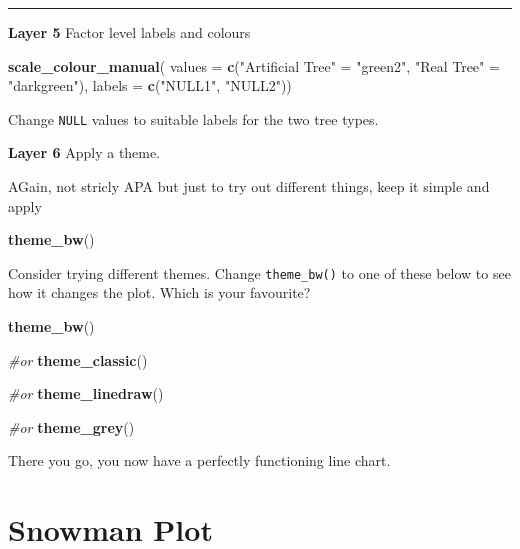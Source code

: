 \documentclass[
]{book}
\newenvironment{Shaded}{\begin{snugshade}}{\end{snugshade}}
\newcommand{\AttributeTok}[1]{\textcolor[rgb]{0.13,0.29,0.53}{#1}}
\newcommand{\CommentTok}[1]{\textcolor[rgb]{0.56,0.35,0.01}{\textit{#1}}}
\newcommand{\FunctionTok}[1]{\textcolor[rgb]{0.13,0.29,0.53}{\textbf{#1}}}
\newcommand{\NormalTok}[1]{#1}
\newcommand{\OtherTok}[1]{\textcolor[rgb]{0.56,0.35,0.01}{#1}}
\newcommand{\StringTok}[1]{\textcolor[rgb]{0.31,0.60,0.02}{#1}}
\let\oldsection\section
\renewcommand{\section}{\needspace{5\baselineskip}\oldsection}
\begin{document}
\begin{center}\rule{0.5\linewidth}{0.5pt}\end{center}

\textbf{Layer 5} Factor level labels and colours

\begin{Shaded}
\begin{Highlighting}[]
\FunctionTok{scale\_colour\_manual}\NormalTok{(}
  \AttributeTok{values =} \FunctionTok{c}\NormalTok{(}\StringTok{"Artificial Tree"} \OtherTok{=} \StringTok{"green2"}\NormalTok{, }\StringTok{"Real Tree"} \OtherTok{=} \StringTok{"darkgreen"}\NormalTok{),}
  \AttributeTok{labels =} \FunctionTok{c}\NormalTok{(}\StringTok{"NULL1"}\NormalTok{, }\StringTok{"NULL2"}\NormalTok{))}
\end{Highlighting}
\end{Shaded}

Change \texttt{NULL} values to suitable labels for the two tree types.

\textbf{Layer 6} Apply a theme.

AGain, not stricly APA but just to try out different things, keep it simple and apply

\begin{Shaded}
\begin{Highlighting}[]
\FunctionTok{theme\_bw}\NormalTok{()}
\end{Highlighting}
\end{Shaded}

Consider trying different themes. Change \texttt{theme\_bw()} to one of these below to see how it changes the plot. Which is your favourite?

\begin{Shaded}
\begin{Highlighting}[]
\FunctionTok{theme\_bw}\NormalTok{()}

\CommentTok{\#or}
\FunctionTok{theme\_classic}\NormalTok{()}

\CommentTok{\#or}
\FunctionTok{theme\_linedraw}\NormalTok{()}

\CommentTok{\#or}
\FunctionTok{theme\_grey}\NormalTok{()}
\end{Highlighting}
\end{Shaded}

There you go, you now have a perfectly functioning line chart.

\section{Snowman Plot}\label{snowman-plot}
\end{document}
